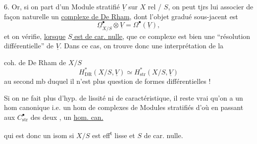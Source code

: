 6. Or,  si on part d'un Module stratifié $\underline V$ sur $X$ rel / $S$, on peut tjrs lui associer de façon naturelle un \uline{complexe de De Rham}, dont l'objet gradué sous-jacent est
\[
\underline\Omega^\bullet_{X/S}\otimes\underline V=\Omega^\bullet(\underline V),
\]
et on vérifie, \uline{lorsque}  \uline{$S$ est de car. nulle}, que ce complexe est bien une ``résolution différentielle'' de $\underline V$.
Dans ce cas, on trouve donc une interprétation  de la

coh. de De Rham de $X/S$
\[
H^*_{\mathrm{DR}}(X/S,\underline V)\simeq H^*_{\mathrm{str}}(X/S,\underline V)
\]
au second mb duquel il n'est plus question de  formes différentielles !

Si on ne fait plus d'hyp. de lissité ni de caractéristique, il reste vrai qu'on a un hom canonique 
i.e. un hom de complexes de Modules stratifiés
d'où en passant aux $C^\bullet_{\mathrm{str}}$ des deux , un \uline{hom. can.}

qui est donc un isom si $X/S$ est eff\textsuperscript{t} lisse et $S$ de car. nulle.

